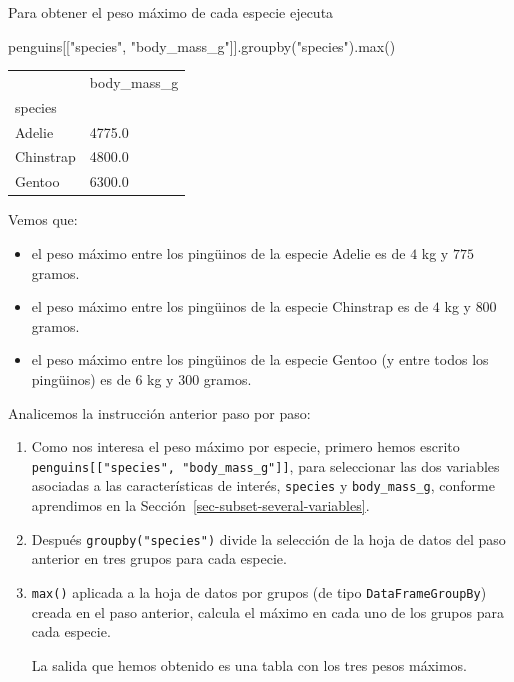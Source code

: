\documentclass[
  a4paper,
  noprof,
  12pt,
  notoc,
  nosols,
  nobib]{mnye}
\newenvironment{Shaded}{\begin{snugshade}}{\end{snugshade}}
\newcommand{\BuiltInTok}[1]{\textcolor[rgb]{0.00,0.23,0.31}{#1}}
\newcommand{\NormalTok}[1]{\textcolor[rgb]{0.00,0.23,0.31}{#1}}
\newcommand{\StringTok}[1]{\textcolor[rgb]{0.13,0.47,0.30}{#1}}
\providecommand{\tightlist}{%
  \setlength{\itemsep}{0pt}\setlength{\parskip}{0pt}}\usepackage{longtable,booktabs,array}
\theoremstyle{definition}
\theoremstyle{remark}
\begin{document}
Para obtener el peso máximo de cada especie ejecuta

\begin{Shaded}
\begin{Highlighting}[]
\NormalTok{penguins[[}\StringTok{"species"}\NormalTok{, }\StringTok{"body\_mass\_g"}\NormalTok{]].groupby(}\StringTok{"species"}\NormalTok{).}\BuiltInTok{max}\NormalTok{()}
\end{Highlighting}
\end{Shaded}

\begin{longtable}[]{@{}ll@{}}
\toprule\noalign{}
& body\_mass\_g \\
species & \\
\midrule\noalign{}
\endhead
\bottomrule\noalign{}
\endlastfoot
Adelie & 4775.0 \\
Chinstrap & 4800.0 \\
Gentoo & 6300.0 \\
\end{longtable}

Vemos que:

\begin{itemize}
\tightlist
\item
  el peso máximo entre los pingüinos de la especie Adelie es de \(4\) kg
  y \(775\) gramos.
\item
  el peso máximo entre los pingüinos de la especie Chinstrap es de \(4\)
  kg y \(800\) gramos.
\item
  el peso máximo entre los pingüinos de la especie Gentoo (y entre todos
  los pingüinos) es de \(6\) kg y \(300\) gramos.
\end{itemize}

Analicemos la instrucción anterior paso por paso:

\begin{enumerate}
\def\labelenumi{\arabic{enumi}.}
\item
  Como nos interesa el peso máximo por especie, primero hemos escrito
  \texttt{penguins{[}{[}"species",\ "body\_mass\_g"{]}{]}}, para
  seleccionar las dos variables asociadas a las características de
  interés, \texttt{species} y \texttt{body\_mass\_g}, conforme
  aprendimos en la Sección~\ref{sec-subset-several-variables}.
\item
  Después \texttt{groupby("species")} divide la selección de la hoja de
  datos del paso anterior en tres grupos para cada especie.
\item
  \texttt{max()} aplicada a la hoja de datos por grupos (de tipo
  \texttt{DataFrameGroupBy}) creada en el paso anterior, calcula el
  máximo en cada uno de los grupos para cada especie.

  La salida que hemos obtenido es una tabla con los tres pesos máximos.
\end{enumerate}
\end{document}
